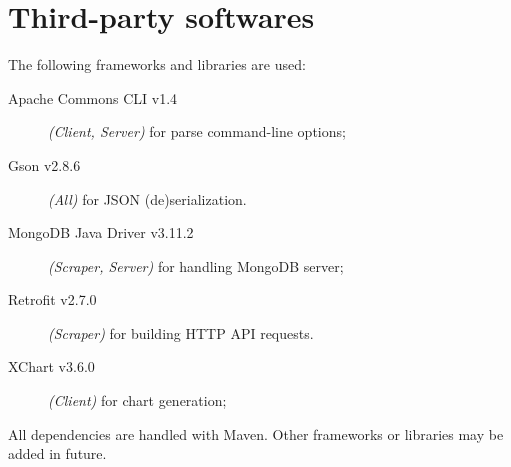 \section{Third-party softwares}\label{sec:dependencies}

The following frameworks and libraries are used:
\begin{description}
	\item[Apache Commons CLI v1.4] \textit{(Client, Server)} for parse
		command-line options;
	\item[Gson v2.8.6] \textit{(All)} for JSON (de)serialization.
	\item[MongoDB Java Driver v3.11.2] \textit{(Scraper, Server)} for
		handling MongoDB server;
	\item[Retrofit v2.7.0] \textit{(Scraper)} for building HTTP API
		requests.
	\item[XChart v3.6.0] \textit{(Client)} for chart generation;
\end{description}

All dependencies are handled with Maven. Other frameworks or libraries may be
added in future.
